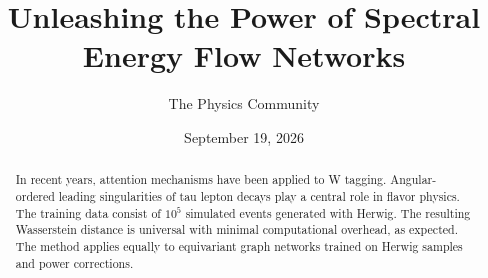 \documentclass[11pt]{article}
\title{Unleashing the Power of Spectral Energy Flow Networks}
\author{The Physics Community}
\date{September 19, 2026}
\numberwithin{equation}{section}
\theoremstyle{definition}
\theoremstyle{remark}
\begin{document}
\maketitle
\begin{abstract}
In recent years, attention mechanisms have been applied to W tagging.
Angular-ordered leading singularities of tau lepton decays play a
central role in flavor physics. The training data consist of $10^5$
simulated events generated with Herwig. The resulting Wasserstein
distance is universal with minimal computational overhead, as expected.
The method applies equally to equivariant graph networks trained on
Herwig samples and power corrections.
\end{abstract}
\tableofcontents





\nocite{*}


\end{document}
